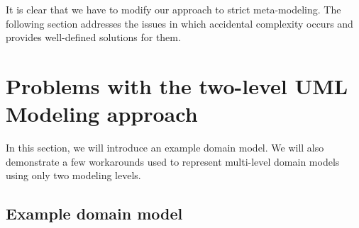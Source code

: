 It is clear that we have to modify our approach to strict meta-modeling. The following section addresses the issues in which accidental complexity occurs and provides well-defined solutions for them.

\section{Problems with the two-level UML Modeling approach}

In this section, we will introduce an example domain model. We will also demonstrate a few workarounds used to represent multi-level domain models using only two modeling levels.

\subsection{Example domain model}

